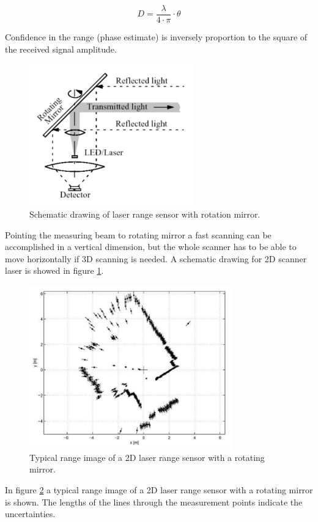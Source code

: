 \[
D = \frac{\lambda}{4\cdot\pi}\cdot{\theta}
\]

Confidence in the range (phase estimate) is inversely proportion to
the square of the received signal amplitude.
\begin{figure} [h]
  \begin{center}
    \includegraphics[width=200pt]{img/laser_rotation.png}
    \caption{Schematic drawing of laser range sensor with
      rotation mirror.}
    \label{fig:laser_rotation}
  \end{center}
\end{figure}
Pointing the measuring beam
to rotating mirror a fast scanning can be accomplished in a vertical
dimension, but the whole scanner has to be able to move horizontally
if 3D scanning is needed. A schematic drawing for 2D scanner laser
is showed in figure \ref{fig:laser_rotation}.
\begin{figure} [!h]
  \begin{center}
    \includegraphics[width=250pt]{img/laser_scan_map.png}
    \caption{Typical range image of a 2D laser range sensor with a
      rotating mirror.}
    \label{fig:laser_scan_map}
  \end{center}
\end{figure}
In figure \ref{fig:laser_scan_map} a typical range image of a 2D
laser range sensor with
a rotating mirror is shown. The lengths of the lines through the
measurement points indicate the uncertainties.


